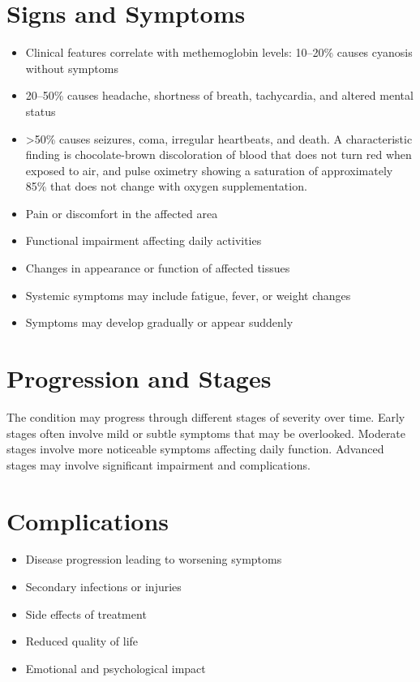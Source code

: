 \section{Signs and Symptoms}
\begin{itemize}[noitemsep]
  \item Clinical features correlate with methemoglobin levels: 10--20\% causes cyanosis without symptoms
  \item 20--50\% causes headache, shortness of breath, tachycardia, and altered mental status
  \item >50\% causes seizures, coma, irregular heartbeats, and death. A characteristic finding is chocolate-brown discoloration of blood that does not turn red when exposed to air, and pulse oximetry showing a saturation of approximately 85\% that does not change with oxygen supplementation.
  \item Pain or discomfort in the affected area
  \item Functional impairment affecting daily activities
  \item Changes in appearance or function of affected tissues
  \item Systemic symptoms may include fatigue, fever, or weight changes
  \item Symptoms may develop gradually or appear suddenly
\end{itemize}
\section{Progression and Stages}
The condition may progress through different stages of severity over time. Early stages often involve mild or subtle symptoms that may be overlooked. Moderate stages involve more noticeable symptoms affecting daily function. Advanced stages may involve significant impairment and complications.
\section{Complications}
\begin{itemize}[noitemsep]
  \item Disease progression leading to worsening symptoms
  \item Secondary infections or injuries
  \item Side effects of treatment
  \item Reduced quality of life
  \item Emotional and psychological impact
\end{itemize}
